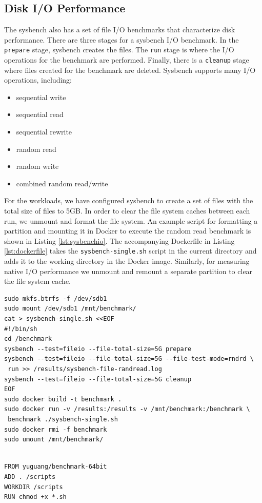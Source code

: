\documentclass[11pt]{article}
\begin{document}
\subsection{Disk I/O Performance}
The sysbench also has a set of file I/O benchmarks that characterize disk performance. There are three stages for a sysbench I/O benchmark. In the \texttt{prepare} stage, sysbench creates the files. The \texttt{run} stage is where the I/O operations for the benchmark are performed. Finally, there is a \texttt{cleanup} stage where files created for the benchmark are deleted. Sysbench supports many I/O operations, including:
\begin{itemize}
	\item sequential write
	\item sequential read
	\item sequential rewrite
	\item random read
	\item random write
	\item combined random read/write
\end{itemize}
For the workloads, we have configured sysbench to create a set of files with the total size of files to 5GB. In order to clear the file system caches between each run, we unmount and format the file system. An example script for formatting a partition and mounting it in Docker to execute the random read benchmark is shown in Listing \ref{lst:sysbenchio}. The accompanying Dockerfile in Listing \ref{lst:dockerfile} takes the \texttt{sysbench-single.sh} script in the current directory and adds it to the working directory in the Docker image. Similarly, for measuring native I/O performance we unmount and remount a separate partition to clear the file system cache. 

\lstset{caption=Sysbench File I/O Random Read Bash Script, label=lst:sysbenchio}
\begin{lstlisting}
sudo mkfs.btrfs -f /dev/sdb1
sudo mount /dev/sdb1 /mnt/benchmark/
cat > sysbench-single.sh <<EOF
#!/bin/sh
cd /benchmark
sysbench --test=fileio --file-total-size=5G prepare
sysbench --test=fileio --file-total-size=5G --file-test-mode=rndrd \
 run >> /results/sysbench-file-randread.log
sysbench --test=fileio --file-total-size=5G cleanup
EOF
sudo docker build -t benchmark .
sudo docker run -v /results:/results -v /mnt/benchmark:/benchmark \
 benchmark ./sysbench-single.sh
sudo docker rmi -f benchmark
sudo umount /mnt/benchmark/
\end{lstlisting}

\lstset{caption=Dockerfile for Building Benchmark Image, label=lst:dockerfile}
\begin{lstlisting}

FROM yuguang/benchmark-64bit
ADD . /scripts
WORKDIR /scripts
RUN chmod +x *.sh
\end{lstlisting}
\end{document}
